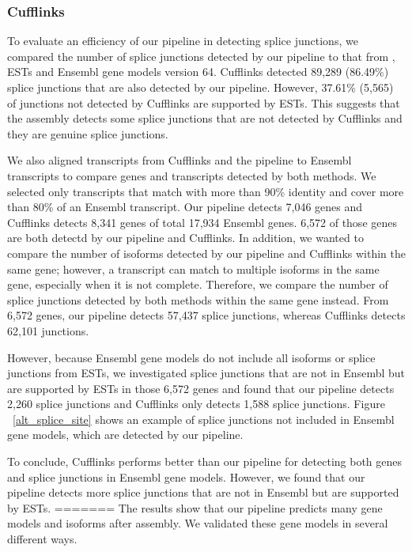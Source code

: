 \documentclass[10pt]{article}
\begin{document}
\subsubsection{Cufflinks}

To evaluate an efficiency of our pipeline in detecting splice junctions,
we compared the number of splice junctions detected by our pipeline to that from , ESTs and
Ensembl gene models version 64.
Cufflinks detected 89,289 (86.49\%) splice junctions that are also detected by our pipeline.
However, 37.61\% (5,565) of junctions not detected by Cufflinks are supported by ESTs.
This suggests that the assembly detects some splice junctions that are not detected by Cufflinks and they are
genuine splice junctions.

We also aligned transcripts from Cufflinks and the pipeline to Ensembl transcripts to compare genes and transcripts detected by
both methods.
We selected only transcripts that match with more than 90\% identity and cover more than 80\% of an Ensembl transcript.
Our pipeline detects 7,046 genes and Cufflinks detects 8,341 genes of total 17,934 Ensembl genes.
6,572 of those genes are both detectd by our pipeline and Cufflinks.
In addition, we wanted to compare the number of isoforms detected by our pipeline and Cufflinks within the same gene; however,
a transcript can match to multiple isoforms in the same gene, especially when it is not complete.
Therefore, we compare the number of splice junctions detected by both methods within the same gene instead.
From 6,572 genes, our pipeline detects 57,437 splice junctions, whereas Cufflinks detects 62,101 junctions.

However, because Ensembl gene models do not include all isoforms or splice junctions from ESTs, we investigated splice junctions
that are not in Ensembl but are supported by ESTs in those 6,572 genes and found that our pipeline detects 2,260 splice junctions
and Cufflinks only detects 1,588 splice junctions. Figure ~\ref{alt_splice_site} shows an example of splice junctions not included in Ensembl gene models, which are detected by our pipeline.

To conclude, Cufflinks performs better than our pipeline for detecting both genes and splice junctions in Ensembl gene models.
However, we found that our pipeline detects more splice junctions that are not in Ensembl but are supported by ESTs.
=======
The results show that our pipeline predicts many gene models and
isoforms after assembly.  We validated these gene models in several
different ways.
\end{document}
